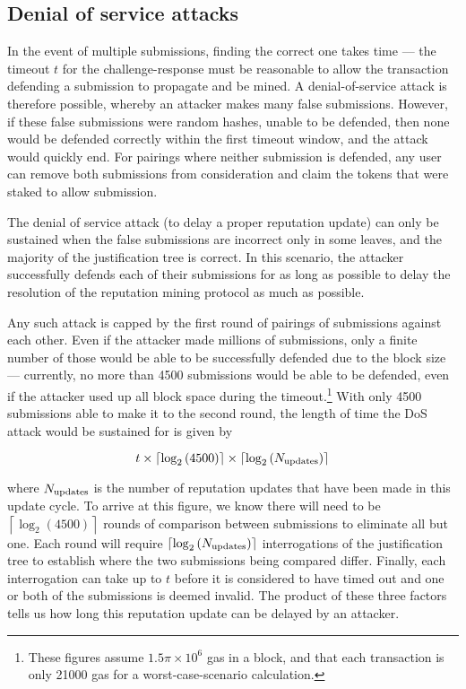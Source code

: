 \subsection{Denial of service attacks}\label{sec:mining-possible-attacks}

In the event of multiple submissions, finding the correct one takes time --- the timeout $t$ for the challenge-response must be reasonable to allow the transaction defending a submission to propagate and be mined. A denial-of-service attack is therefore possible, whereby an attacker makes many false submissions. However, if these false submissions were random hashes, unable to be defended, then none would be defended correctly within the first timeout window, and the attack would quickly end. For pairings where neither submission is defended, any user can remove both submissions from consideration and claim the tokens that were staked to allow submission.

The denial of service attack (to delay a proper reputation update) can only be sustained when the false submissions are incorrect only in some leaves, and the majority of the justification tree is correct. In this scenario, the attacker successfully defends each of their submissions for as long as possible to delay the resolution of the reputation mining protocol as much as possible.

Any such attack is capped by the first round of pairings of submissions against each other. Even if the attacker made millions of submissions, only a finite number of those would be able to be successfully defended due to the block size --- currently, no more than 4500 submissions would be able to be defended, even if the attacker used up all block space during the timeout.\footnote{These figures assume $1.5\pi\times10^6$ gas in a block, and that each transaction is only 21000 gas for a worst-case-scenario calculation.} With only 4500 submissions able to make it to the second round, the length of time the DoS attack would be sustained for is given by 

$$t \times \left\lceil\log_2\left(4500\right)\right\rceil\times \left\lceil\log_2\left(N_{\rm updates}\right)\right\rceil$$

\noindent where $N_{\rm updates}$ is the number of reputation updates that have been made in this update cycle. To arrive at this figure, we know there will need to be $\left\lceil\log_2\left(4500\right)\right\rceil$ rounds of comparison between submissions to eliminate all but one. Each round will require $\left\lceil\log_2\left(N_{\rm updates}\right)\right\rceil$ interrogations of the justification tree to establish where the two submissions being compared differ. Finally, each interrogation can take up to $t$ before it is considered to have timed out and one or both of the submissions is deemed invalid. The product of these three factors tells us how long this reputation update can be delayed by an attacker.

